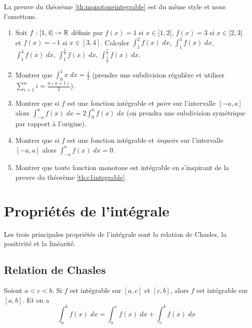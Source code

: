 \documentclass[class=report,crop=false]{standalone}
\begin{document}
La preuve du théorème \ref{th:monotoneintegrable} est du même style
et nous l'omettons.



\begin{miniexercices}
\sauteligne
\begin{enumerate}
  \item Soit $f : [1,4] \to \mathbb{R}$ définie par $f(x)=1$ si $x\in[1,2[$, $f(x)=3$ si $x\in [2,3[$
et $f(x)=-1$ si $x \in [3,4]$. Calculer $\int_1^2 f(x) \;dx$, $\int_1^3 f(x)\;dx$, $\int_1^4 f(x)\;dx$,
$\int_1^{\frac32} f(x) \;dx$, $\int_{\frac32}^{\frac72} f(x) \;dx$.
  \item Montrer que $\int_0^1 x \; dx =\frac12$ (prendre une subdivision régulière
et utiliser $\sum_{i=1}^n i = \frac{n(n+1)}{2}$).
  \item Montrer que si $f$ est une fonction intégrable et \emph{paire} sur l'intervalle $[-a,a]$ alors
$\int_{-a}^a f(x)\;dx = 2 \int_0^a f(x)\; dx$ (on prendra une subdivision symétrique par rapport à l'origine).
  \item Montrer que si $f$ est une fonction intégrable et \emph{impaire} sur l'intervalle $[-a,a]$ alors
  $\int_{-a}^a f(x)\;dx = 0$.
  \item Montrer que toute fonction monotone est intégrable en s'inspirant de la preuve du théorème
\ref{th:c1integrable}.
\end{enumerate}
\end{miniexercices}

\section{Propriétés de l'intégrale}
\label{sec:int2}

Les trois principales propriétés de l'intégrale sont
la relation de Chasles, la positivité et la linéarité.

\subsection{Relation de Chasles}
\label{ssec:int21}

\begin{proposition}
Soient $a<c<b$. Si $f$ est intégrable sur $[a,c]$ et $[c,b]$, alors
$f$ est intégrable sur $[a,b]$.
Et on a $$\int_a^b f(x)\;dx = \int_a^c f(x) \; dx + \int_c^b f(x)\;dx$$
\end{proposition}
\end{document}
